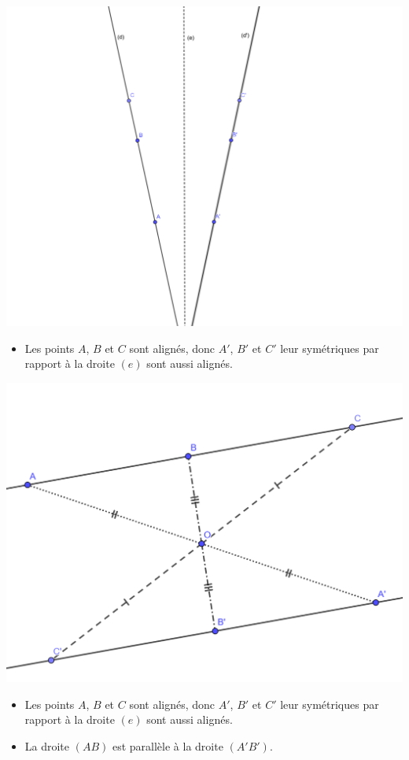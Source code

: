 \documentclass[12pt,a4paper]{article}
\begin{document}
\begin{myexs}
	\begin{multicols}{2}
		\begin{center}
			\includegraphics[scale=0.1]{sym_droites1}
		\end{center}
		
		\begin{itemize}
			\item Les points $A$, $B$ et $C$ sont alignés, donc $A'$, $B'$ et $C'$ leur symétriques par rapport à la droite $(e)$ sont aussi alignés.
		\end{itemize}	
		
		\begin{center}
			\includegraphics[scale=0.2]{sym_droites2}
		\end{center}
		
		\begin{itemize}
			\item Les points $A$, $B$ et $C$ sont alignés, donc $A'$, $B'$ et $C'$ leur symétriques par rapport à la droite $(e)$ sont aussi alignés.
			\item La droite $(AB)$ est parallèle à la droite $(A'B')$.
		\end{itemize}
	\end{multicols}
\end{myexs}
\end{document}
